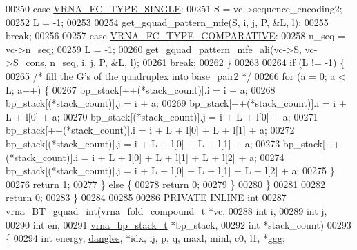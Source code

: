 \begin{DoxyCode}
00250       \textcolor{keywordflow}{case} \hyperlink{group__fold__compound_gga01a4ff86fa71deaaa5d1abbd95a1447da7e264dd3cf2dc9b6448caabcb7763cd6}{VRNA\_FC\_TYPE\_SINGLE}:
00251         S = vc->sequence\_encoding2;
00252         L = -1;
00253 
00254         get\_gquad\_pattern\_mfe(S, i, j, P, &L, l);
00255         \textcolor{keywordflow}{break};
00256 
00257       \textcolor{keywordflow}{case} \hyperlink{group__fold__compound_gga01a4ff86fa71deaaa5d1abbd95a1447dab821ce46ea3cf665be97df22a76f5023}{VRNA\_FC\_TYPE\_COMPARATIVE}:
00258         n\_seq = vc->\hyperlink{group__fold__compound_a614702ab74478e786272be44f8cebfe3}{n\_seq};
00259         L     = -1;
00260         get\_gquad\_pattern\_mfe\_ali(vc->\hyperlink{group__fold__compound_aebb37297f92c7bd22aac6343f8f61d61}{S}, vc->\hyperlink{group__fold__compound_aa3fab7ae38ebfed2028375221d295686}{S\_cons}, n\_seq, i, j, P, &L, l);
00261         \textcolor{keywordflow}{break};
00262     \}
00263 
00264     \textcolor{keywordflow}{if} (L != -1) \{
00265       \textcolor{comment}{/* fill the G's of the quadruplex into base\_pair2 */}
00266       \textcolor{keywordflow}{for} (a = 0; a < L; a++) \{
00267         bp\_stack[++(*stack\_count)].i  = i + a;
00268         bp\_stack[(*stack\_count)].j    = i + a;
00269         bp\_stack[++(*stack\_count)].i  = i + L + l[0] + a;
00270         bp\_stack[(*stack\_count)].j    = i + L + l[0] + a;
00271         bp\_stack[++(*stack\_count)].i  = i + L + l[0] + L + l[1] + a;
00272         bp\_stack[(*stack\_count)].j    = i + L + l[0] + L + l[1] + a;
00273         bp\_stack[++(*stack\_count)].i  = i + L + l[0] + L + l[1] + L + l[2] + a;
00274         bp\_stack[(*stack\_count)].j    = i + L + l[0] + L + l[1] + L + l[2] + a;
00275       \}
00276       \textcolor{keywordflow}{return} 1;
00277     \} \textcolor{keywordflow}{else} \{
00278       \textcolor{keywordflow}{return} 0;
00279     \}
00280   \}
00281 
00282   \textcolor{keywordflow}{return} 0;
00283 \}
00284 
00285 
00286 PRIVATE INLINE \textcolor{keywordtype}{int}
00287 vrna\_BT\_gquad\_int(\hyperlink{group__fold__compound_structvrna__fc__s}{vrna\_fold\_compound\_t}  *vc,
00288                   \textcolor{keywordtype}{int}                   i,
00289                   \textcolor{keywordtype}{int}                   j,
00290                   \textcolor{keywordtype}{int}                   en,
00291                   \hyperlink{group__data__structures_structvrna__bp__stack__s}{vrna\_bp\_stack\_t}       *bp\_stack,
00292                   \textcolor{keywordtype}{int}                   *stack\_count)
00293 \{
00294   \textcolor{keywordtype}{int}           energy, \hyperlink{group__model__details_ga72b511ed1201f7e23ec437e468790d74}{dangles}, *idx, ij, p, q, maxl, minl, c0, l1, *ggg;

\end{DoxyCode}
